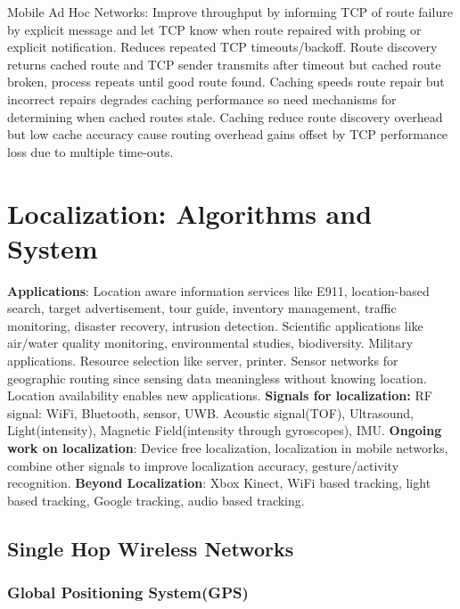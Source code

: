 \documentclass[9pt]{extarticle}
\begin{document}
\begin{multicols}{2}
Mobile Ad Hoc Networks: Improve throughput by informing TCP of route failure by explicit message and let TCP know when route repaired with probing or explicit notification. Reduces repeated TCP timeouts/backoff. Route discovery returns cached route and TCP sender transmits after timeout but cached route broken, process repeats until good route found. Caching speeds route repair but incorrect repairs degrades caching performance so need mechanisms for determining when cached routes stale. Caching reduce route discovery overhead but low cache accuracy cause routing overhead gains offset by TCP performance loss due to multiple time-outs.     

\section{Localization: Algorithms and System}

\textbf{Applications}: Location aware information services like E911, location-based search, target advertisement, tour guide, inventory management, traffic monitoring, disaster recovery, intrusion detection. Scientific applications like air/water quality monitoring, environmental studies, biodiversity. Military applications. Resource selection like server, printer. Sensor networks for geographic routing since sensing data meaningless without knowing location. Location availability enables new applications. \textbf{Signals for localization:} RF signal: WiFi, Bluetooth, sensor, UWB. Acoustic signal(TOF), Ultrasound, Light(intensity), Magnetic Field(intensity through gyroscopes), IMU. \textbf{Ongoing work on localization}: Device free localization, localization in mobile networks, combine other signals to improve localization accuracy, gesture/activity recognition. \textbf{Beyond Localization}: Xbox Kinect, WiFi based tracking, light based tracking, Google tracking, audio based tracking.

\subsection{Single Hop Wireless Networks}

\subsubsection{Global Positioning System(GPS)}


\end{multicols}
\end{document}

